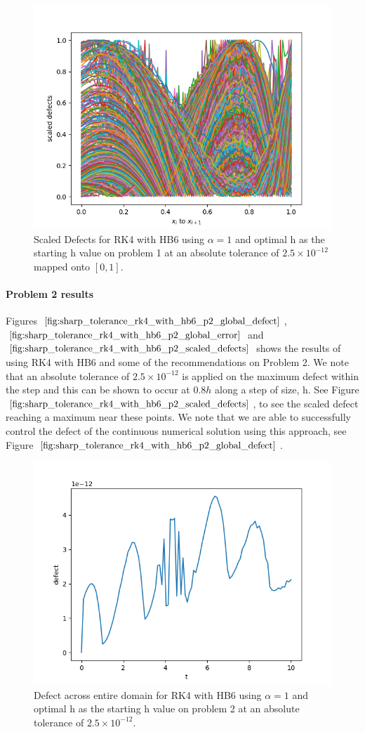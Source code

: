 \begin{figure}[H]
\centering
\includegraphics[width=0.7\linewidth]{./figures/sharp_tolerance_rk4_with_hb6_p1_scaled_defects}
\caption{Scaled Defects for RK4 with HB6 using $\alpha = 1$ and optimal h as the starting h value on problem 1 at an absolute tolerance of $2.5 \times 10^{-12}$ mapped onto $[0, 1]$.}
\label{fig:sharp_tolerance_rk4_with_hb6_p1_scaled_defects}
\end{figure}

\paragraph{Problem 2 results}
Figures $\ref{fig:sharp_tolerance_rk4_with_hb6_p2_global_defect}$, $\ref{fig:sharp_tolerance_rk4_with_hb6_p2_global_error}$ and $\ref{fig:sharp_tolerance_rk4_with_hb6_p2_scaled_defects}$ shows the results of using RK4 with HB6 and some of the recommendations on Problem 2. We note that an absolute tolerance of $2.5 \times 10^{-12}$ is applied on the maximum defect within the step and this can be shown to occur at $0.8h$ along a step of size, h. See Figure $\ref{fig:sharp_tolerance_rk4_with_hb6_p2_scaled_defects}$, to see the scaled defect reaching a maximum near these points. We note that we are able to successfully control the defect of the continuous numerical solution using this approach, see Figure $\ref{fig:sharp_tolerance_rk4_with_hb6_p2_global_defect}$. 

\begin{figure}[H]
\centering
\includegraphics[width=0.7\linewidth]{./figures/sharp_tolerance_rk4_with_hb6_p2_global_defect}
\caption{Defect across entire domain for RK4 with HB6 using $\alpha = 1$ and optimal h as the starting h value on problem 2 at an absolute tolerance of $2.5 \times 10^{-12}$.}
\label{fig:sharp_tolerance_rk4_with_hb6_p2_global_defect}
\end{figure}

